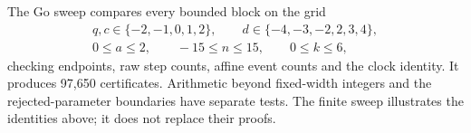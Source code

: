 \documentclass[11pt,letterpaper]{article}
\begin{document}
The Go sweep compares every bounded block on the grid
\[
\begin{gathered}
q,c\in\{-2,-1,0,1,2\},\qquad d\in\{-4,-3,-2,2,3,4\},\\
0\le a\le2,\qquad -15\le n\le15,\qquad 0\le k\le6,
\end{gathered}
\]
checking endpoints, raw step counts, affine event counts and the clock identity.
It produces 97{,}650 certificates.
Arithmetic beyond fixed-width integers and the rejected-parameter boundaries
have separate tests. The finite sweep illustrates the identities above; it does
not replace their proofs.
\end{document}
